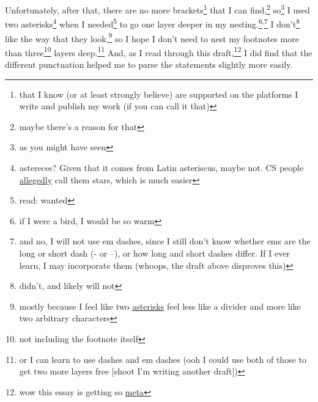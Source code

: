 \documentclass[a4paper]{article}
\newcommand{\1}{\={a}}
\newcommand{\2}{\={e}}
\newcommand{\3}{\={\i}}
\newcommand{\4}{\=o}
\newcommand{\5}{\=u}
\newcommand{\6}{\={A}}
\newcommand{\<}{\textless}
\renewcommand{\>}{\textgreater}
\renewcommand{\,}{\textsuperscript{,}}
\begin{document}
Unfortunately, after that, there are no more brackets\footnote{that I know (or at least strongly believe) are supported on the platforms I write and publish my work (if you can call it that)} that I can find,\footnote{maybe there's a reason for that} so\footnote{as you might have seen} I used two asterisks\footnote{astereces? Given that it comes from Latin asteriscus, maybe not. CS people \href{https://en.wikipedia.org/wiki/Asterisk}{allegedly} call them stars, which is much easier} when I needed\footnote{read: wanted} to go one layer deeper in my nesting.\footnote{if I were a bird, I would be so warm}\,\footnote{and no, I will not use em dashes, since I still don't know whether ems are the long or short dash (- or --), or how long and short dashes differ. If I ever learn, I may incorporate them (whoops, the draft above disproves this)}
I don't\footnote{didn't, and likely will not} like the way that they look,\footnote{mostly because I feel like two \href{https://en.wiktionary.org/wiki/asterisk}{asterisks} feel less like a divider and more like two arbitrary characters} so I hope I don't need to nest my footnotes more than three\footnote{not including the footnote itself} layers deep.\footnote{or I can learn to use dashes and em dashes (ooh I could use both of those to get two more layers free [shoot I'm writing another draft])}
And, as I read through this draft,\footnote{wow this essay is getting so \href{https://xkcd.com/917/}{meta}} I did find that the different punctuation helped me to parse the statements slightly more easily.
\end{document}
